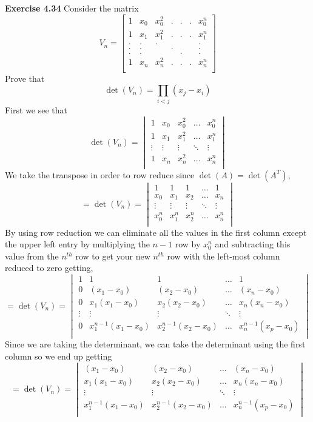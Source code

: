 \documentclass[letterpaper,12pt]{article}
\theoremstyle{definition}
\begin{document}
\textbf{Exercise 4.34}
Consider the matrix 
\[V_n=\begin{bmatrix}
   1 &  x_0 & x_0^2&.&.&.&x_0^n \\
   1 &  x_1& x_1^2&.&.&.&x_1^n\\
   . &  . & .&&&&. \\
   . &  .& &.&&&.\\
   . &  . & &&.&&. \\
   1 &  x_n& x_n^2&.&.&.&x_n^n\\
  \end{bmatrix}\]
Prove that
\[\det (V_n)=\prod _{i<j}(x_j-x_i)\]
First we see that 
\[\det(V_n)=\begin{vmatrix}
   1 &  x_0 & x_0^2&\hdots&x_0^n \\
   1 &  x_1& x_1^2&\hdots&x_1^n\\
   \vdots&\vdots&\vdots &\ddots&\vdots\\
   1 &  x_n& x_n^2&\hdots&x_n^n\\
   \end{vmatrix}\]
We take the transpose in order to row reduce since $\det(A)=\det (A^T)$,
\[=\det(V_n)=\begin{vmatrix}
   1 &  1& 1&\hdots&1 \\
   x_0 &  x_1& x_2&\hdots&x_n\\
   \vdots&\vdots&\vdots &\ddots&\vdots\\
   x_0^n &  x_1^n& x_2^n&\hdots&x_n^n\\
   \end{vmatrix}\]
  By using row reduction we can eliminate all the values in the first column except the upper left entry by multiplying the $n-1$ row by $x_0^n$ and subtracting this value from the $n^{th}$ row to get your new $n^{th}$ row with the left-most column reduced to zero getting,
   \[=\det(V_n)=\begin{vmatrix}
   1 &  1& 1&\hdots&1 \\
   0 &  (x_1-x_0)& (x_2-x_0) &\hdots&(x_n-x_0)\\
   0&x_1(x_1-x_0)& x_2(x_2-x_0)&\hdots& x_n(x_n-x_0)\\
   \vdots&\vdots&\vdots &\ddots&\vdots\\
   0 &  x_1^{n-1}(x_1-x_0)& x_2^{n-1}(x_2-x_0)&\hdots&x_n^{n-1}(x_p-x_0)\\
   \end{vmatrix}\]
   Since we are taking the determinant, we can take the determinant using the first column so we end up getting
   \[=\det(V_n)=\begin{vmatrix}
   (x_1-x_0)& (x_2-x_0) &\hdots&(x_n-x_0)\\
   x_1(x_1-x_0)& x_2(x_2-x_0)&\hdots& x_n(x_n-x_0)\\
   \vdots&\vdots &\ddots&\vdots\\
  x_1^{n-1}(x_1-x_0)& x_2^{n-1}(x_2-x_0)&\hdots&x_n^{n-1}(x_p-x_0)\\
   \end{vmatrix}\]
\end{document}
